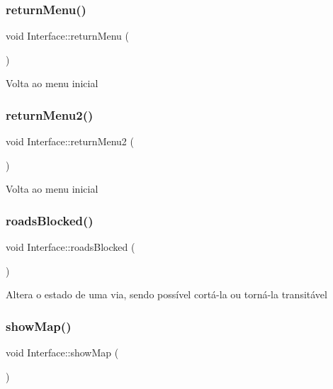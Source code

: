 \subsubsection{\texorpdfstring{return\+Menu()}{returnMenu()}}
{\footnotesize\ttfamily void Interface\+::return\+Menu (\begin{DoxyParamCaption}{ }\end{DoxyParamCaption})}

Volta ao menu inicial \mbox{\label{class_interface_a7b37d708a88660698fc79f0e7bbedb95}} 
\subsubsection{\texorpdfstring{return\+Menu2()}{returnMenu2()}}
{\footnotesize\ttfamily void Interface\+::return\+Menu2 (\begin{DoxyParamCaption}{ }\end{DoxyParamCaption})}

Volta ao menu inicial \mbox{\label{class_interface_a8b09945f62fc12fb90de30046042efe3}} 
\subsubsection{\texorpdfstring{roads\+Blocked()}{roadsBlocked()}}
{\footnotesize\ttfamily void Interface\+::roads\+Blocked (\begin{DoxyParamCaption}{ }\end{DoxyParamCaption})}

Altera o estado de uma via, sendo possível cortá-\/la ou torná-\/la transitável \mbox{\label{class_interface_aec46d793b0a3ac1196dd61df896e154a}} 
\subsubsection{\texorpdfstring{show\+Map()}{showMap()}}
{\footnotesize\ttfamily void Interface\+::show\+Map (\begin{DoxyParamCaption}{ }\end{DoxyParamCaption})}

